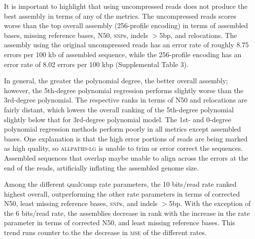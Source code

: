 \documentclass{bioinfo}
\begin{document}
It is important to highlight that using uncompressed reads does not
produce the best assembly in terms of any of the metrics. The
uncompressed reads scores worse than the top overall assembly
(256-profile encoding) in terms of assembled bases, missing reference
bases, N50, \textsc{snp}s, indels $>$5bp, and relocations. The
assembly using the original uncompressed reads has an error rate of
roughly 8.75 errors per 100 kb of assembled sequence, while the
256-profile encoding has an error rate of 8.02 errors per 100 kbp
(Supplemental Table 3).

In general, the greater the polynomial degree, the better overall
assembly; however, the 5th-degree polynomial regression performs
slightly worse than the 3rd-degree polynomial. The respective ranks in
terms of N50 and relocations are fairly distant, which lowers the
overall ranking of the 5th-degree polynomial slightly below that for
3rd-degree polynomial model. The 1st- and 0-degree polynomial
regression methods perform poorly in all metrics except assembled
bases. One explanation is that the high error portions of reads are
being marked as high quality, so \textsc{allpaths-lg} is unable to
trim or error correct the sequences. Assembled sequences that overlap
maybe unable to align across the errors at the end of the reads,
artificially inflating the assembled genome size.

Among the different \textsc{q}ual\textsc{c}omp rate parameters, the 10
bits/read rate ranked highest overall, outperforming the other rate
parameters in terms of corrected N50, least missing reference bases,
\textsc{snp}s, and indels $>$5bp. With the exception of the 6
bits/read rate, the assemblies decrease in rank with the increase in
the rate parameter in terms of corrected N50, and least missing
reference bases. This trend runs counter to the the decrease in
\textsc{mse} of the different rates.
\end{document}
